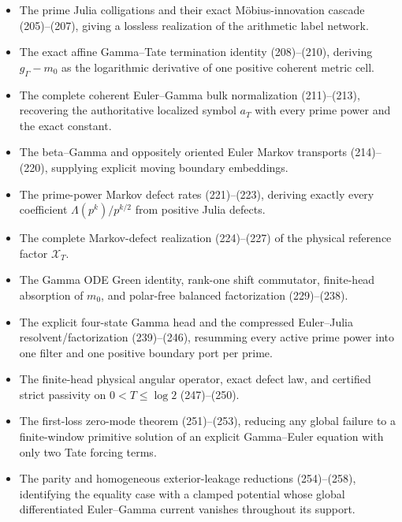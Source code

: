 \documentclass[11pt]{article}
\begin{document}
\begin{itemize}
      $g_\Gamma$ as an unbounded affine cocycle energy rather than a bounded
      coherent-orbit distance.
\item The prime Julia colligations and their exact M\"obius-innovation
      cascade (205)--(207), giving a lossless realization of the arithmetic
      label network.
\item The exact affine Gamma--Tate termination identity (208)--(210), deriving
      $g_\Gamma-m_0$ as the logarithmic derivative of one positive coherent
      metric cell.
\item The complete coherent Euler--Gamma bulk normalization (211)--(213),
      recovering the authoritative localized symbol $a_T$ with every prime
      power and the exact constant.
\item The beta--Gamma and oppositely oriented Euler Markov transports
      (214)--(220), supplying explicit moving boundary embeddings.
\item The prime-power Markov defect rates (221)--(223), deriving exactly
      every coefficient $\Lambda(p^k)/p^{k/2}$ from positive Julia defects.
\item The complete Markov-defect realization (224)--(227) of the physical
      reference factor $\mathcal X_T$.
\item The Gamma ODE Green identity, rank-one shift commutator, finite-head
      absorption of $m_0$, and polar-free balanced factorization
      (229)--(238).
\item The explicit four-state Gamma head and the compressed Euler--Julia
      resolvent/factorization (239)--(246), resumming every active prime power
      into one filter and one positive boundary port per prime.
\item The finite-head physical angular operator, exact defect law, and
      certified strict passivity on $0<T\le\log2$ (247)--(250).
\item The first-loss zero-mode theorem (251)--(253), reducing any global
      failure to a finite-window primitive solution of an explicit
      Gamma--Euler equation with only two Tate forcing terms.
\item The parity and homogeneous exterior-leakage reductions (254)--(258),
      identifying the equality case with a clamped potential whose global
      differentiated Euler--Gamma current vanishes throughout its support.
\end{itemize}
\end{document}
